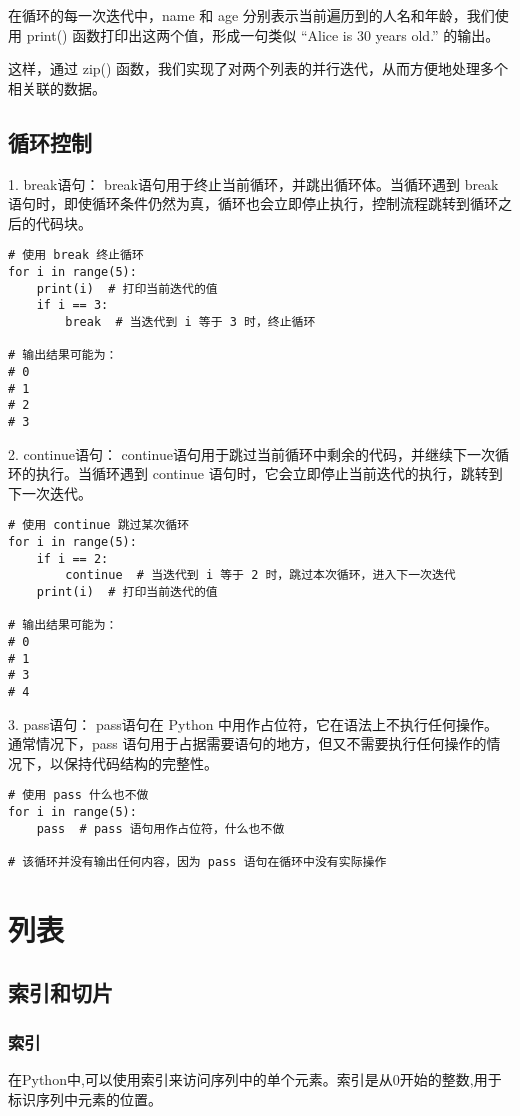\documentclass{article}
\begin{document}
在循环的每一次迭代中，name 和 age 分别表示当前遍历到的人名和年龄，我们使用 print() 函数打印出这两个值，形成一句类似 “Alice is 30 years old.” 的输出。

这样，通过 zip() 函数，我们实现了对两个列表的并行迭代，从而方便地处理多个相关联的数据。
\subsection{循环控制}
1. break语句：
break语句用于终止当前循环，并跳出循环体。当循环遇到 break 语句时，即使循环条件仍然为真，循环也会立即停止执行，控制流程跳转到循环之后的代码块。
\begin{lstlisting}[caption={示例Python代码}]
# 使用 break 终止循环
for i in range(5):
    print(i)  # 打印当前迭代的值
    if i == 3:
        break  # 当迭代到 i 等于 3 时，终止循环

# 输出结果可能为：
# 0
# 1
# 2
# 3
\end{lstlisting}
2. continue语句：
continue语句用于跳过当前循环中剩余的代码，并继续下一次循环的执行。当循环遇到 continue 语句时，它会立即停止当前迭代的执行，跳转到下一次迭代。
\begin{lstlisting}[caption={示例Python代码}]
# 使用 continue 跳过某次循环
for i in range(5):
    if i == 2:
        continue  # 当迭代到 i 等于 2 时，跳过本次循环，进入下一次迭代
    print(i)  # 打印当前迭代的值

# 输出结果可能为：
# 0
# 1
# 3
# 4
\end{lstlisting}
3. pass语句：
pass语句在 Python 中用作占位符，它在语法上不执行任何操作。通常情况下，pass 语句用于占据需要语句的地方，但又不需要执行任何操作的情况下，以保持代码结构的完整性。
\begin{lstlisting}[caption={示例Python代码}]
# 使用 pass 什么也不做
for i in range(5):
    pass  # pass 语句用作占位符，什么也不做

# 该循环并没有输出任何内容，因为 pass 语句在循环中没有实际操作

\end{lstlisting}
\section{列表}
\subsection{索引和切片}
\subsubsection{索引}
在Python中,可以使用索引来访问序列中的单个元素。索引是从0开始的整数,用于标识序列中元素的位置。
\end{document}
